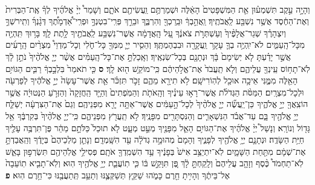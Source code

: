 \documentclass[twoside, openany, parskip=half, 11pt]{book}
\begin{document}
\begin{footnotesize}
\begin{multicols}{2}
\\
 וְהָיָ֣ה עֵ֣קֶב תִּשְׁמְע֗וּן אֵ֤ת הַמִּשְׁפָּטִים֙ הָאֵ֔לֶּה וּשְׁמַרְתֶּ֥ם וַֽעֲשִׂיתֶ֖ם אֹתָ֑ם וְשָׁמַר֩ יְיָ֨ אֱלֹהֶ֜יךָ לְךָ֗ אֶֽת־הַבְּרִית֙ וְאֶת־הַחֶ֔סֶד אֲשֶׁ֥ר נִשְׁבַּ֖ע לַֽאֲבֹתֶֽיךָ׃ וַֽאֲהֵ֣בְךָ֔ וּבֵֽרַכְךָ֖ וְהִרְבֶּ֑ךָ וּבֵרַ֣ךְ פְּרִֽי־בִטְנְךָ֣ וּפְרִֽי־אַ֠דְמָתֶ֠ךָ דְּגָ֨נְךָ֜ וְתִֽירשְׁךָ֣ וְיִצְהָרֶ֗ךָ שְׁגַר־אֲלָפֶ֨יךָ֙ וְעַשְׁתְּרֹ֣ת צֹאנֶ֔ךָ עַ֚ל הָֽאֲדָמָ֔ה אֲשֶׁר־נִשְׁבַּ֥ע לַֽאֲבֹתֶ֖יךָ לָ֥תֶת לָֽךְ׃ בָּר֥וּךְ תִּֽהְיֶ֖ה מִכָּל־הָֽעַמִּ֑ים לֹא־יִֽהְיֶ֥ה בְךָ֛ עָקָ֥ר וַֽעֲקָרָ֖ה וּבִבְהֶמְתֶּֽךָ׃ וְהֵסִ֧יר יְיָ֛ מִמְּךָ֖ כָּל־חֹ֑לִי וְכָל־מַדְוֵי֩ מִצְרַ֨יִם הָֽרָעִ֜ים אֲשֶׁ֣ר יָדַ֗עְתָּ לֹ֤א יְשִׂימָם֙ בָּ֔ךְ וּנְתָנָ֖ם בְּכָל־שֽׂנְאֶֽיךָ׃ וְאָֽכַלְתָּ֣ אֶת־כָּל־הָֽעַמִּ֗ים אֲשֶׁ֨ר יְיָ֤ אֱלֹהֶ֨יךָ֙ נֹתֵ֣ן לָ֔ךְ לֹֽא־תָח֥וֹס עֵֽינְךָ֖ עֲלֵיהֶ֑ם וְלֹ֤א תַֽעֲבֹד֙ אֶת־אֱלֹ֣הֵיהֶ֔ם כִּֽי־מוֹקֵ֥שׁ ה֖וּא לָֽךְ׃ \textbf{ס} כִּ֤י תֹאמַר֙ בִּלְבָ֣בְךָ֔ רַבִּ֛ים הַגּוֹיִ֥ם הָאֵ֖לֶּה מִמֶּ֑נִּי אֵיכָ֥ה אוּכַ֖ל לְהֽוֹרִישָֽׁם׃ לֹ֥א תִירָ֖א מֵהֶ֑ם זָכֹ֣ר תִּזְכֹּ֗ר אֵ֤ת אֲשֶׁר־עָשָׂה֙ יְיָ֣ אֱלֹהֶ֔יךָ לְפַרְעֹ֖ה וּלְכָל־מִצְרָֽיִם׃ הַמַּסֹּ֨ת הַגְּדֹלֹ֜ת אֲשֶׁר־רָא֣וּ עֵינֶ֗יךָ וְהָֽאֹתֹ֤ת וְהַמֹּֽפְתִים֙ וְהַיָּ֤ד הַֽחֲזָקָה֙ וְהַזְּרֹ֣עַ הַנְּטוּיָ֔ה אֲשֶׁ֥ר הוֹצִֽאֲךָ֖ יְיָ֣ אֱלֹהֶ֑יךָ כֵּן־יַֽעֲשֶׂ֞ה יְיָ֤ אֱלֹהֶ֨יךָ֙ לְכָל־הָ֣עַמִּ֔ים אֲשֶׁר־אַתָּ֥ה יָרֵ֖א מִפְּנֵיהֶֽם׃ וְגַם֙ אֶת־הַצִּרְעָ֔ה יְשַׁלַּ֛ח יְיָ֥ אֱלֹהֶ֖יךָ בָּ֑ם עַד־אֲבֹ֗ד הַנִּשְׁאָרִ֛ים וְהַנִּסְתָּרִ֖ים מִפָּנֶֽיךָ׃ לֹ֥א תַֽעֲרֹ֖ץ מִפְּנֵיהֶ֑ם כִּֽי־יְיָ֤ אֱלֹהֶ֨יךָ֙ בְּקִרְבֶּ֔ךָ אֵ֥ל גָּד֖וֹל וְנוֹרָֽא׃  וְנָשַׁל֩ יְיָ֨ אֱלֹהֶ֜יךָ אֶת־הַגּוֹיִ֥ם הָאֵ֛ל מִפָּנֶ֖יךָ מְעַ֣ט מְעָ֑ט לֹ֤א תוּכַל֙ כַּלֹּתָ֣ם מַהֵ֔ר פֶּן־תִּרְבֶּ֥ה עָלֶ֖יךָ חַיַּ֥ת הַשָּׂדֶֽה׃ וּנְתָנָ֛ם יְיָ֥ אֱלֹהֶ֖יךָ לְפָנֶ֑יךָ וְהָמָם֙ מְהוּמָ֣ה גְדֹלָ֔ה עַ֖ד הִשָּֽׁמְדָֽם׃ וְנָתַ֤ן מַלְכֵיהֶם֙ בְּיָדֶ֔ךָ וְהַֽאֲבַדְתָּ֣ אֶת־שְׁמָ֔ם מִתַּ֖חַת הַשָּׁמָ֑יִם לֹֽא־יִתְיַצֵּ֥ב אִישׁ֙ בְּפָנֶ֔יךָ עַ֥ד הִשְׁמִֽדְךָ֖ אֹתָֽם׃ פְּסִילֵ֥י אֱלֹֽהֵיהֶ֖ם תִּשְׂרְפ֣וּן בָּאֵ֑שׁ לֹֽא־תַחְמֹד֩ כֶּ֨סֶף וְזָהָ֤ב עֲלֵיהֶם֙ וְלָֽקַחְתָּ֣ לָ֔ךְ פֶּ֚ן תִּוָּקֵ֣שׁ בּ֔וֹ כִּ֧י תֽוֹעֲבַ֛ת יְיָ֥ אֱלֹהֶ֖יךָ הֽוּא׃ וְלֹֽא־תָבִ֤יא תֽוֹעֵבָה֙ אֶל־בֵּיתֶ֔ךָ וְהָיִ֥יתָ חֵ֖רֶם כָּמֹ֑הוּ שַׁקֵּ֧ץ תְּשַׁקְּצֶ֛נּוּ וְתַעֵ֥ב תְּֽתַעֲבֶ֖נּוּ כִּי־חֵ֥רֶם הֽוּא׃ \textbf{פ} 

\end{multicols}
\end{footnotesize}
\end{document}
